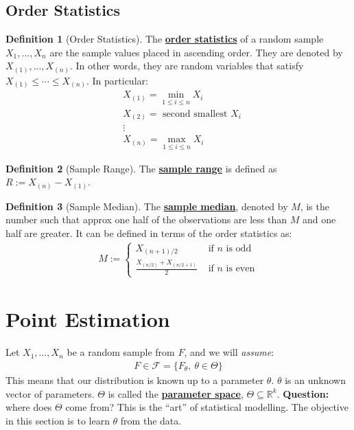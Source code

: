 \documentclass[11pt]{scrartcl}
\newcommand{\R}[0]{\mathbb{R}}
\theoremstyle{definition}
\newtheorem{definition}{Definition}
\theoremstyle{remark}
\newcommand{\dfn}[1]{\textbf{\underline{#1}}}
\newcommand{\dist}[0]{\mathcal{F}}
\begin{document}
\subsection{Order Statistics}
\begin{definition}[Order Statistics]
	The \dfn{order statistics} of a random sample $X_1, ..., X_n$ are the sample values placed in ascending order. They are denoted by $X_{(1)}, ..., X_{(n)}$. In other words, they are random variables that satisfy $X_{(1)} \leq \cdots \leq X_{(n)}$. In particular: 
	\begin{align*}
		& X_{(1)} = \min_{1 \leq i \leq n} X_i \\
		& X_{(2)} = \text{ second smallest } X_i \\
		& \vdots 	\\
		& X_{(n)} = \max_{1 \leq i \leq n } X_i 
	\end{align*}
\end{definition}


\begin{definition}[Sample Range]
	The \dfn{sample range} is defined as $R:= X_{(n)} - X_{(1)}$. 
\end{definition}

\begin{definition}[Sample Median]
	The \dfn{sample median}, denoted by $M$, is the number such that approx one half of the observations are less than $M$ and one half are greater. It can be defined in terms of the order statistics as: 
	\begin{align*}
		M := \begin{cases}
			X_{(n+1)/2} & \text{ if $n$ is odd} \\
			\frac{X_{(n/2)} + X_{(n/2+1)}}{2} & \text{ if $n$ is even}
		\end{cases}	
	\end{align*}
\end{definition}

\section{Point Estimation}
Let $X_1, ..., X_n$ be a random sample from $F$, and we will \emph{assume}: 
\begin{align*}
F \in \dist = \{ F_\theta,\ \theta \in \Theta \} 
\end{align*}
This means that our distribution is known up to a parameter $\theta$. $\theta$ is an unknown vector of parameters. $\Theta$ is called the \dfn{parameter space}, $\Theta \subseteq \R^k$. \textbf{Question:} where does $\Theta$ come from? This is the ``art'' of statistical modelling. The objective in this section is to learn $\theta$ from the data. 
\end{document}

